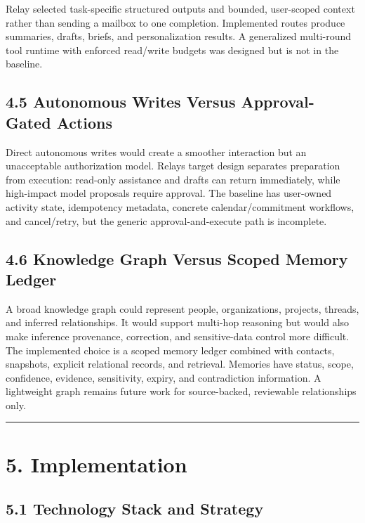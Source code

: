 \documentclass[
]{report}
\begin{document}
Relay selected task-specific structured outputs and bounded,
user-scoped context rather than sending a mailbox to one completion.
Implemented routes produce summaries, drafts, briefs, and
personalization results. A generalized multi-round tool runtime with
enforced read/write budgets was designed but is not in the baseline.

\section{4.5 Autonomous Writes Versus Approval-Gated
Actions}\label{45-autonomous-writes-versus-approval-gated-actions}

Direct autonomous writes would create a smoother interaction but an
unacceptable authorization model. Relay\textquotesingle s target design
separates preparation from execution: read-only assistance and drafts
can return immediately, while high-impact model proposals require
approval. The baseline has user-owned activity state, idempotency
metadata, concrete calendar/commitment workflows, and cancel/retry, but
the generic approval-and-execute path is incomplete.

\section{4.6 Knowledge Graph Versus Scoped Memory
Ledger}\label{46-knowledge-graph-versus-scoped-memory-ledger}

A broad knowledge graph could represent people, organizations, projects,
threads, and inferred relationships. It would support multi-hop
reasoning but would also make inference provenance, correction, and
sensitive-data control more difficult. The implemented choice is a
scoped memory ledger combined with contacts, snapshots, explicit
relational records, and retrieval. Memories have status, scope,
confidence, evidence, sensitivity, expiry, and contradiction
information. A lightweight graph remains future work for source-backed,
reviewable relationships only.

\begin{center}\rule{0.5\linewidth}{0.5pt}\end{center}

\chapter{5. Implementation}\label{5-implementation}

\section{5.1 Technology Stack and
Strategy}\label{51-technology-stack-and-strategy}
\end{document}
